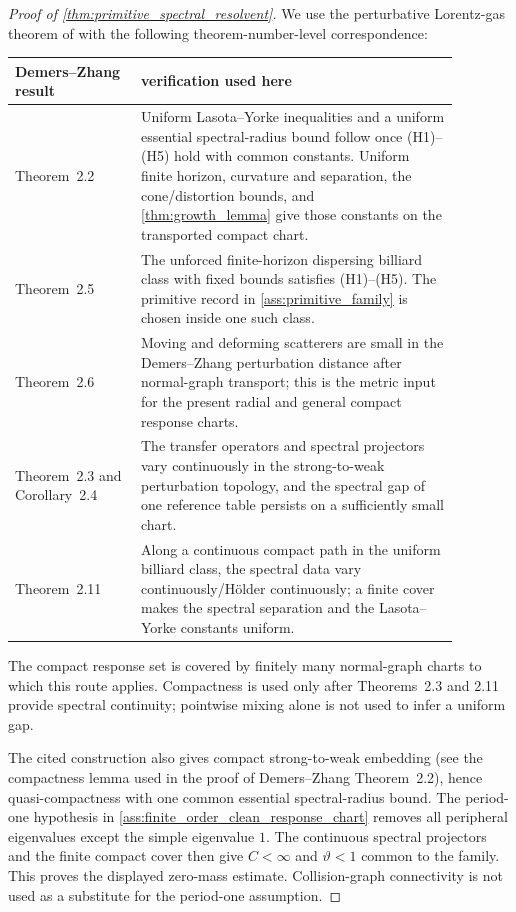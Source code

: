 \documentclass[11pt]{amsart}
\theoremstyle{compactplain}
\theoremstyle{compactdefinition}
\theoremstyle{compactremark}
\begin{document}
\begin{proof}[Proof of \cref{thm:primitive_spectral_resolvent}]
We use the perturbative Lorentz-gas theorem of
\cite[Theorems~2.2, 2.3, 2.5, 2.6, and~2.11; Corollary~2.4]{DemersZhang2013}
with the following theorem-number-level
correspondence:
\begin{center}
\small
\begin{tabular}{p{0.25\linewidth}p{0.63\linewidth}}
\hline
Demers--Zhang result & verification used here\\
\hline
Theorem~2.2 &
Uniform Lasota--Yorke inequalities and a uniform essential spectral-radius
bound follow once (H1)--(H5) hold with common constants.  Uniform finite
horizon, curvature and separation, the cone/distortion bounds, and
\cref{thm:growth_lemma} give those constants on the transported compact
chart.\\
Theorem~2.5 &
The unforced finite-horizon dispersing billiard class with fixed bounds
satisfies (H1)--(H5).  The primitive record in
\cref{ass:primitive_family} is chosen inside one such class.\\
Theorem~2.6 &
Moving and deforming scatterers are small in the Demers--Zhang perturbation
distance after normal-graph transport; this is the metric input for the
present radial and general compact response charts.\\
Theorem~2.3 and Corollary~2.4 &
The transfer operators and spectral projectors vary continuously in the
strong-to-weak perturbation topology, and the spectral gap of one reference
table persists on a sufficiently small chart.\\
Theorem~2.11 &
Along a continuous compact path in the uniform billiard class, the spectral
data vary continuously/Hölder continuously; a finite cover makes the
spectral separation and the Lasota--Yorke constants uniform.\\
\hline
\end{tabular}
\end{center}
The compact response set is covered by finitely many normal-graph charts to
which this route applies.  Compactness is used only after Theorems~2.3 and
2.11 provide spectral continuity; pointwise mixing alone is not used to infer
a uniform gap.

The cited construction also gives compact strong-to-weak embedding (see the
compactness lemma used in the proof of Demers--Zhang Theorem~2.2), hence
quasi-compactness with one common essential spectral-radius bound.  The
period-one hypothesis in
\cref{ass:finite_order_clean_response_chart} removes all peripheral
eigenvalues except the simple eigenvalue \(1\).  The continuous spectral
projectors and the finite compact cover then give
\(C<\infty\) and \(\vartheta<1\) common to the family.  This proves the
displayed zero-mass estimate.  Collision-graph connectivity is not used as a
substitute for the period-one assumption.
\end{proof}
\end{document}
